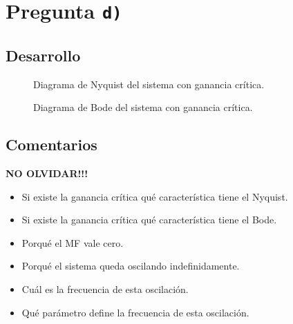 \section{Pregunta \texttt{d)}}\label{pregunta-d}


\subsection{Desarrollo}

\begin{figure}[h]
  \centering
  
  \caption{Diagrama de Nyquist del sistema con ganancia crítica.}
  \label{fig:nyquist-d}
\end{figure}

\begin{figure}[h]
  \centering
  
  \caption{Diagrama de Bode del sistema con ganancia crítica.}
  \label{fig:bode-d}
\end{figure}


\FloatBarrier
\subsection{Comentarios}

\textbf{NO OLVIDAR!!!}



\begin{itemize}
  \item Si existe la ganancia crítica qué característica tiene el Nyquist.
  \item Si existe la ganancia crítica qué característica tiene el Bode.
  \item Porqué el MF vale cero.
  \item Porqué el sistema queda oscilando indefinidamente.
  \item Cuál es la frecuencia de esta oscilación.
  \item Qué parámetro define la frecuencia de esta oscilación.
\end{itemize}
